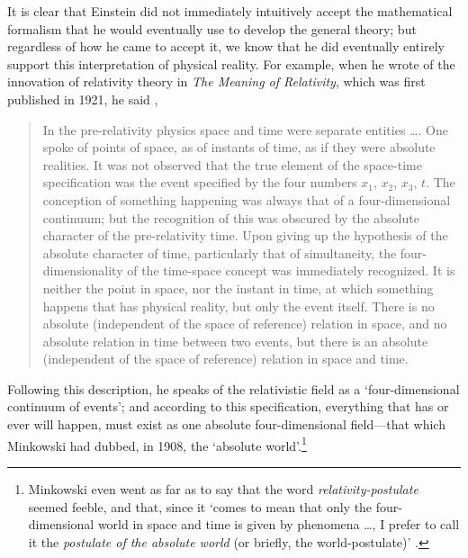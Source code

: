 It is clear that Einstein did not immediately intuitively accept the mathematical formalism that he would eventually use to develop the general theory; but regardless of how he came to accept it, we know that he did eventually entirely support this interpretation of physical reality. For example, when he wrote of the innovation of relativity theory in \textit{The Meaning of Relativity}, which was first published in 1921, he said \cite{Einstein1945},
\begin{quotation}
In the pre-relativity physics space and time were separate entities \ldots. One spoke of points of space, as of instants of time, as if they were absolute realities. It was not observed that the true element of the space-time specification was the event specified by the four numbers $x_1$, $x_2$, $x_3$, $t$. The conception of something happening was always that of a four-dimensional continuum; but the recognition of this was obscured by the absolute character of the pre-relativity time. Upon giving up the hypothesis of the absolute character of time, particularly that of simultaneity, the four-dimensionality of the time-space concept was immediately recognized. It is neither the point in space, nor the instant in time, at which something happens that has physical reality, but only the event itself. There is no absolute (independent of the space of reference) relation in space, and no absolute relation in time between two events, but there is an absolute (independent of the space of reference) relation in space and time.
\end{quotation}
Following this description, he speaks of the relativistic field as a `four-dimensional continuum of events'; and according to this specification, everything that has or ever will happen, must exist as one absolute four-dimensional field---that which Minkowski had dubbed, in 1908, the `absolute world'.\footnote{Minkowski even went as far as to say that the word \textit{relativity-postulate} seemed feeble, and that, since it `comes to mean that only the four-dimensional world in space and time is given by phenomena \ldots, I prefer to call it the \textit{postulate of the absolute world} (or briefly, the world-postulate)' \cite{Einstein1952}.} 

